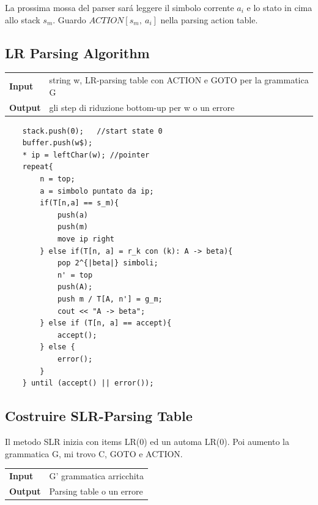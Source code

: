 La prossima mossa del parser sar\'a leggere il simbolo corrente $a_i$ e lo stato in cima allo stack $s_m$. 
Guardo $ACTION[s_m,\ a_i]$ nella parsing action table. 

\subsection{LR Parsing Algorithm}

\begin{center}\begin{tabular}{ll}
    \textbf{Input}  &   string w, LR-parsing table con ACTION e GOTO per la grammatica G\\ 
    \textbf{Output} &   gli step di riduzione bottom-up per w o un errore\\
\end{tabular}\end{center}

\begin{lstlisting}
    stack.push(0);   //start state 0
    buffer.push(w$);
    * ip = leftChar(w); //pointer
    repeat{
        n = top;
        a = simbolo puntato da ip;
        if(T[n,a] == s_m){
            push(a)
            push(m)
            move ip right
        } else if(T[n, a] = r_k con (k): A -> beta){
            pop 2^{|beta|} simboli;
            n' = top 
            push(A);
            push m / T[A, n'] = g_m;
            cout << "A -> beta";
        } else if (T[n, a] == accept){
            accept();
        } else {
            error();
        }
    } until (accept() || error());
\end{lstlisting}

\subsection{Costruire SLR-Parsing Table}

Il metodo SLR inizia con items LR(0) ed un automa LR(0). Poi aumento la grammatica G, mi trovo C, GOTO e ACTION.

\begin{center}\begin{tabular}{ll}
    \textbf{Input}  &   G' grammatica arricchita\\ 
    \textbf{Output} &   Parsing table o un errore\\
\end{tabular}\end{center}

